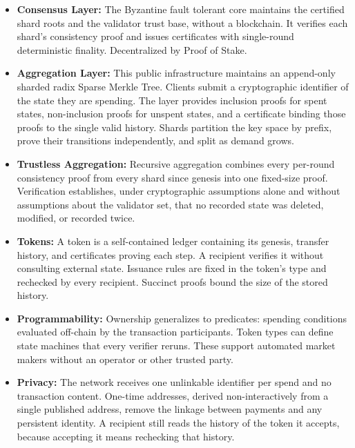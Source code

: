 \documentclass{article}
\begin{document}
\begin{itemize}
    \item \textbf{Consensus Layer:}
    The Byzantine fault tolerant core maintains the certified shard roots and the validator trust base, without a blockchain. It verifies each shard's consistency proof and issues certificates with single-round deterministic finality. Decentralized by Proof of Stake.

    \item \textbf{Aggregation Layer:}
    This public infrastructure maintains an append-only sharded radix Sparse Merkle Tree. Clients submit a cryptographic identifier of the state they are spending. The layer provides inclusion proofs for spent states, non-inclusion proofs for unspent states, and a certificate binding those proofs to the single valid history. Shards partition the key space by prefix, prove their transitions independently, and split as demand grows.

    \item \textbf{Trustless Aggregation:}
    Recursive aggregation combines every per-round consistency proof from every shard since genesis into one fixed-size proof. Verification establishes, under cryptographic assumptions alone and without assumptions about the validator set, that no recorded state was deleted, modified, or recorded twice.

    \item \textbf{Tokens:}
    A token is a self-contained ledger containing its genesis, transfer history, and certificates proving each step. A recipient verifies it without consulting external state. Issuance rules are fixed in the token's type and rechecked by every recipient. Succinct proofs bound the size of the stored history.

    \item \textbf{Programmability:}
    Ownership generalizes to predicates: spending conditions evaluated off-chain by the transaction participants. Token types can define state machines that every verifier reruns. These support automated market makers without an operator or other trusted party.

    \item \textbf{Privacy:}
    The network receives one unlinkable identifier per spend and no transaction content. One-time addresses, derived non-interactively from a single published address, remove the linkage between payments and any persistent identity. A recipient still reads the history of the token it accepts, because accepting it means rechecking that history.


\end{itemize}
\end{document}

